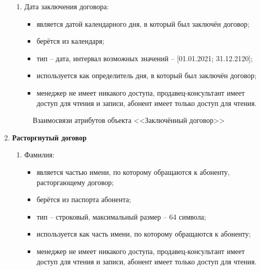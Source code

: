 \begin{enumerate}
\begin{enumerate}
        \item Дата заключения договора:
        \begin{itemize}
            \item является датой календарного дня, в который был заключён договор;
            \item берётся из календаря;
            \item тип -- дата, интервал возможных значений -- [01.01.2021; 31.12.2120];
            \item используется как определитель дня, в который был заключён договор;
            \item менеджер не имеет никакого доступа, продавец-консультант имеет доступ для чтения и записи, абонент имеет только доступ для чтения.
        \end{itemize}
    \end{enumerate}
    \begin{figure}[H]
        \label{fig:contract-attributes}
        \caption{Взаимосвязи атрибутов объекта <<Заключённый договор>>}
    \end{figure}

    \item \textbf{Расторгнутый договор}
    \begin{enumerate}
        \item Фамилия:
        \begin{itemize}
            \item является частью имени, по которому обращаются к абоненту, расторгающему договор;
            \item берётся из паспорта абонента;
            \item тип -- строковый, максимальный размер -- 64 символа;
            \item используется как часть имени, по которому обращаются к абоненту;
            \item менеджер не имеет никакого доступа, продавец-консультант имеет доступ для чтения и записи, абонент имеет только доступ для чтения.
        \end{itemize}


\end{enumerate}
\end{enumerate}
